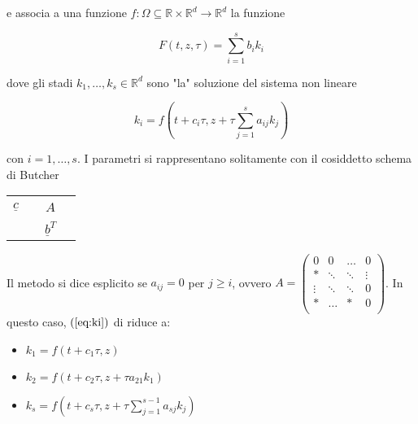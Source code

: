 \documentclass[hidelinks, 10pt]{report}
\begin{document}
e associa a una funzione $ f: \Omega \subseteq \mathbb{R} \times \mathbb{R}^{d} \to \mathbb{R}^{d} $ la funzione

\[ F(t, z, \tau) = \sum\limits_{i = 1}^{s} b_{i} k_{i} \]

dove gli stadi $ k_{1}, \dotsc, k_{s} \in \mathbb{R}^{d} $ sono "la" soluzione del sistema non lineare

\begin{equation}	\label{eq:ki}
k_{i} = f \left( t + c_{i} \tau, z + \tau \sum\limits_{j = 1}^{s} a_{ij} k_{j} \right)
\end{equation}

con $ i = 1, \dotsc, s $. I parametri si rappresentano solitamente con il cosiddetto schema di Butcher

\begin{center}
\begin{tabular}{c|ccc}
                  &   &       & \\
$ \underline{c} $ &   & $ A $ & \\
				  &   &       & \\
\hline
				  &   & $ \underline{b}^{T} $ & \\
\end{tabular}
\end{center}

Il metodo si dice esplicito se $ a_{ij} = 0 $ per $ j \ge i $, ovvero $ A = \begin{pmatrix}
	     0 &      0 & \ldots &      0 \\
	  \ast & \ddots & \ddots & \vdots \\
	\vdots & \ddots & \ddots &      0 \\
	  \ast & \ldots &   \ast &      0 \\
\end{pmatrix} $. In questo caso, $ (\ref{eq:ki}) $ di riduce a:
\begin{itemize}
\item $ k_{1} = f(t + c_{1} \tau, z) $
\item $ k_{2} = f(t + c_{2} \tau, z + \tau a_{21} k_{1}) $
\item $ k_{s} = f \left( t + c_{s} \tau, z + \tau \sum\limits_{j = 1}^{s-1} a_{sj} k_{j} \right) $
\end{itemize}
\end{document}
